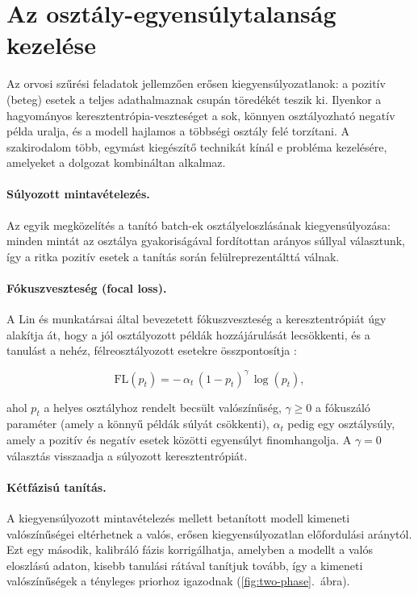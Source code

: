 \section{Az osztály-egyensúlytalanság kezelése}
\label{sec:imbalance}

Az orvosi szűrési feladatok jellemzően erősen kiegyensúlyozatlanok: a pozitív
(beteg) esetek a teljes adathalmaznak csupán töredékét teszik ki. Ilyenkor a
hagyományos keresztentrópia-veszteséget a sok, könnyen osztályozható negatív
példa uralja, és a modell hajlamos a többségi osztály felé torzítani. A
szakirodalom több, egymást kiegészítő technikát kínál e probléma kezelésére,
amelyeket a dolgozat kombináltan alkalmaz.

\paragraph{Súlyozott mintavételezés.} Az egyik megközelítés a tanító batch-ek
osztályeloszlásának kiegyensúlyozása: minden mintát az osztálya gyakoriságával
fordítottan arányos súllyal választunk, így a ritka pozitív esetek a tanítás
során felülreprezentálttá válnak.

\paragraph{Fókuszveszteség (focal loss).} A Lin és munkatársai által bevezetett
fókuszveszteség a keresztentrópiát úgy alakítja át, hogy a jól osztályozott
példák hozzájárulását lecsökkenti, és a tanulást a nehéz, félreosztályozott
esetekre összpontosítja \cite{lin2017focal}:

\begin{equation}
  \mathrm{FL}(p_t) = -\,\alpha_t \,(1 - p_t)^{\gamma}\, \log(p_t),
  \label{eq:focal}
\end{equation}

ahol $p_t$ a helyes osztályhoz rendelt becsült valószínűség, $\gamma \ge 0$ a
fókuszáló paraméter (amely a könnyű példák súlyát csökkenti), $\alpha_t$ pedig
egy osztálysúly, amely a pozitív és negatív esetek közötti egyensúlyt
finomhangolja. A $\gamma = 0$ választás visszaadja a súlyozott
keresztentrópiát.

\paragraph{Kétfázisú tanítás.} A kiegyensúlyozott mintavételezés mellett betanított
modell kimeneti valószínűségei eltérhetnek a valós, erősen kiegyensúlyozatlan
előfordulási aránytól. Ezt egy második, kalibráló fázis korrigálhatja, amelyben
a modellt a valós eloszlású adaton, kisebb tanulási rátával tanítjuk tovább, így
a kimeneti valószínűségek a tényleges priorhoz igazodnak (\ref{fig:two-phase}.~ábra).

